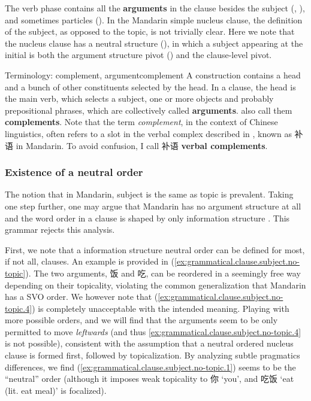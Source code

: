 \documentclass[UTF8, a4paper, oneside, scheme=plain, 12pt]{ctexrep}
\newcommand*{\concept}[1]{\textbf{#1}}
\newcommand*{\term}[1]{\emph{#1}}
\newcommand{\translate}[1]{`#1'}
\begin{document}
The verb phase contains all the \concept{arguments} in the clause besides the subject
(, ),
and sometimes particles ().
In the Mandarin simple nucleus clause,
the definition of the subject, as opposed to the topic,
is not trivially clear.
Here we note that the nucleus clause has a neutral structure (),
in which a subject appearing at the initial is both the argument structure pivot
()
and the clause-level pivot.

\begin{theorybox}{Terminology: complement, argument}{complement}
    A construction contains a head and a bunch of other constituents selected by the head.
    In a clause, the head is the main verb,
    which selects a subject, one or more objects and probably prepositional phrases,
    which are collectively called \concept{arguments}.
    \citet{cgel} also call them \concept{complements}.
    Note that the term \term{complement}, in the context of Chinese linguistics,
    often refers to a slot in the verbal complex described in ,
    known as 补语 in Mandarin.
    To avoid confusion, I call 补语 \concept{verbal complements}.
\end{theorybox}

\subsubsection{Existence of a neutral order}\label{sec:grammatical.clause.subject.topic}

The notion that in Mandarin, subject is the same as topic is prevalent.
Taking one step further, one may argue that Mandarin has no argument structure at all
and the word order in a clause is shaped by only information structure \citep{lapolla20091}.
This grammar rejects this analysis.

First, we note that a information structure neutral order can be defined for most, if not all, clauses.
An example is provided in (\ref{ex:grammatical.clause.subject.no-topic}).
The two arguments, 饭 and 吃, can be reordered in a seemingly free way depending on their topicality,
violating the common generalization that Mandarin has a SVO order.
We however note that (\ref{ex:grammatical.clause.subject.no-topic.4})
is completely unacceptable with the intended meaning.
Playing with more possible orders, and we will find that the arguments seem to be
only permitted to move \emph{leftwards} (and thus \ref{ex:grammatical.clause.subject.no-topic.4} is not possible),
consistent with the assumption that a neutral ordered nucleus clause is formed first,
followed by topicalization.
By analyzing subtle pragmatics differences, we find (\ref{ex:grammatical.clause.subject.no-topic.1}) seems to be the ``neutral'' order 
(although it imposes weak topicality to 你 \translate{you},
and 吃饭 \translate{eat (lit. eat meal)} is focalized).
\end{document}
